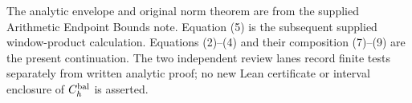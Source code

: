 The analytic envelope and original norm theorem are from the supplied Arithmetic Endpoint Bounds note. Equation (5) is the subsequent supplied window-product calculation. Equations (2)--(4) and their composition (7)--(9) are the present continuation. The two independent review lanes record finite tests separately from written analytic proof; no new Lean certificate or interval enclosure of \(C_h^{\rm bal}\) is asserted.
